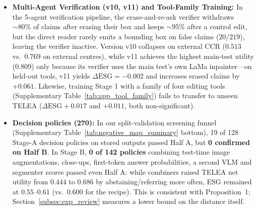 \documentclass[journal]{IEEEtran}
\begin{document}
\begin{itemize}[leftmargin=*,nosep]
    \item \textbf{Multi-Agent Verification (v10, v11) and Tool-Family Training:} In the 5-agent verification pipeline, the erase-and-re-ask verifier withdraws $\sim 80\%$ of claims after erasing their box and keeps $\sim 95\%$ after a control edit, but the direct reader rarely emits a bounding box on false claims ($20/219$), leaving the verifier inactive. Version v10 collapses on external CCR ($0.513$ vs.\ $0.769$ on external centres), while v11 achieves the highest main-test utility ($0.809$) only because its verifier uses the main test's own LaMa inpainter---on held-out tools, v11 yields $\Delta\text{ESG} = -0.002$ and increases erased claims by $+0.061$. Likewise, training Stage 1 with a family of four editing tools (Supplementary Table~\ref{tab:app_tool_family}) fails to transfer to unseen TELEA ($\Delta\text{ESG} +0.017$ and $+0.011$, both non-significant).
    \item \textbf{Decision policies (270):} In our split-validation screening funnel (Supplementary Table~\ref{tab:negative_map_summary} bottom), 19 of 128 Stage-A decision policies on stored outputs passed Half A, but \textbf{0 confirmed on Half B}. In Stage B, \textbf{0 of 142 policies} combining test-time image augmentations, close-ups, first-token answer probabilities, a second VLM and segmenter scores passed even Half A: while combiners raised TELEA net utility from $0.444$ to $0.686$ by abstaining/referring more often, ESG remained at $0.55\text{--}0.61$ (vs.\ $0.600$ for the recipe). This is consistent with Proposition~1; Section~\ref{subsec:exp_review} measures a lower bound on the distance itself.
\end{itemize}
\end{document}
